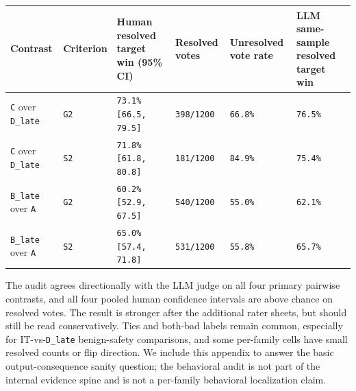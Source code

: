 \documentclass[11pt]{article}
\begin{document}
\begin{table}[t]
\centering
\small
\setlength{\tabcolsep}{3pt}
\begin{tabularx}{\linewidth}{@{}>{\raggedright\arraybackslash}X >{\raggedright\arraybackslash}X >{\raggedright\arraybackslash}X >{\raggedright\arraybackslash}X >{\raggedright\arraybackslash}X >{\raggedright\arraybackslash}X@{}}
\toprule
Contrast & Criterion & Human resolved target win (95\% CI) & Resolved votes & Unresolved vote rate & LLM same-sample resolved target win \\
\midrule
\texttt{C} over \texttt{D\_late} & \texttt{G2} & \texttt{73.1\%} \texttt{[66.5, 79.5]} & \texttt{398/1200} & \texttt{66.8\%} & \texttt{76.5\%} \\
\texttt{C} over \texttt{D\_late} & \texttt{S2} & \texttt{71.8\%} \texttt{[61.8, 80.8]} & \texttt{181/1200} & \texttt{84.9\%} & \texttt{75.4\%} \\
\texttt{B\_late} over \texttt{A} & \texttt{G2} & \texttt{60.2\%} \texttt{[52.9, 67.5]} & \texttt{540/1200} & \texttt{55.0\%} & \texttt{62.1\%} \\
\texttt{B\_late} over \texttt{A} & \texttt{S2} & \texttt{65.0\%} \texttt{[57.4, 71.8]} & \texttt{531/1200} & \texttt{55.8\%} & \texttt{65.7\%} \\
\bottomrule
\end{tabularx}
\end{table}

The audit agrees directionally with the LLM judge on all four primary pairwise contrasts, and all four pooled human confidence intervals are above chance on resolved votes. The result is stronger after the additional rater sheets, but should still be read conservatively. Ties and both-bad labels remain common, especially for IT-vs-\texttt{D\_late} benign-safety comparisons, and some per-family cells have small resolved counts or flip direction. We include this appendix to answer the basic output-consequence sanity question; the behavioral audit is not part of the internal evidence spine and is not a per-family behavioral localization claim.
\end{document}
